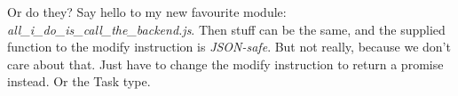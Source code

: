 Or do they? Say hello to my new favourite module:
\textit{all_i_do_is_call_the_backend.js}. Then stuff can be the same, and the
supplied function to the modify instruction is \textit{JSON-safe}. But not
really, because we don't care about that. Just have to change the modify
instruction to return a promise instead. Or the Task type.
